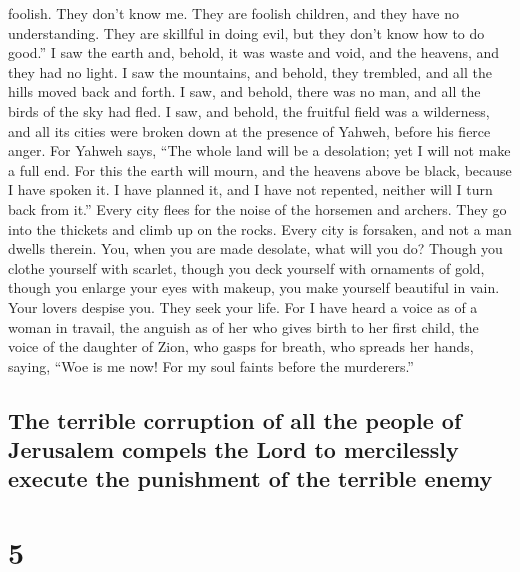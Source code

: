 foolish. They don't know me. They are foolish children, and they have no
understanding. They are skillful in doing evil, but they don't know how
to do good.''  I saw the earth and, behold, it was waste
and void, and the heavens, and they had no light.  I saw
the mountains, and behold, they trembled, and all the hills moved back
and forth.  I saw, and behold, there was no man, and all
the birds of the sky had fled.  I saw, and behold, the
fruitful field was a wilderness, and all its cities were broken down at
the presence of Yahweh, before his fierce anger.  For
Yahweh says, ``The whole land will be a desolation; yet I will not make
a full end.  For this the earth will mourn, and the
heavens above be black, because I have spoken it. I have planned it, and
I have not repented, neither will I turn back from it.'' 
Every city flees for the noise of the horsemen and archers. They go into
the thickets and climb up on the rocks. Every city is forsaken, and not
a man dwells therein.  You, when you are made desolate,
what will you do? Though you clothe yourself with scarlet, though you
deck yourself with ornaments of gold, though you enlarge your eyes with
makeup, you make yourself beautiful in vain. Your lovers despise you.
They seek your life.  For I have heard a voice as of a
woman in travail, the anguish as of her who gives birth to her first
child, the voice of the daughter of Zion, who gasps for breath, who
spreads her hands, saying, ``Woe is me now! For my soul faints before
the murderers.''

\hypertarget{the-terrible-corruption-of-all-the-people-of-jerusalem-compels-the-lord-to-mercilessly-execute-the-punishment-of-the-terrible-enemy}{%
\subsection{The terrible corruption of all the people of Jerusalem
compels the Lord to mercilessly execute the punishment of the terrible
enemy}\label{the-terrible-corruption-of-all-the-people-of-jerusalem-compels-the-lord-to-mercilessly-execute-the-punishment-of-the-terrible-enemy}}

\hypertarget{section-4}{%
\section{5}\label{section-4}}

